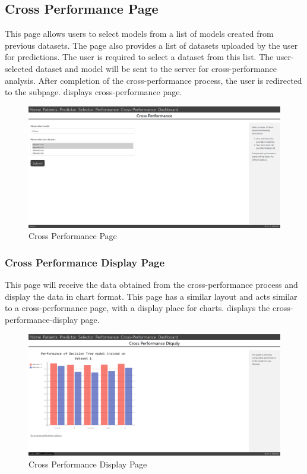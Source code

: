 \subsection{Cross Performance Page} \label{subsec:cross_performance_page}
This page allows users to select models from a list of models created from previous datasets. The page also provides a list of datasets uploaded by the user for predictions. The user is required to select a dataset from this list. The user-selected dataset and model will be sent to the server for cross-performance analysis. After completion of the cross-performance process, the user is redirected to the subpage.  displays cross-performance page.

\begin{figure}[H]
  \centering
  \includegraphics[width=0.7\columnwidth]{media/website/pages/cross_performance_selection.png}
  \caption{Cross Performance Page}
  \label{fig:web_cross_performance_page}
\end{figure}

\subsubsection{Cross Performance Display Page} \label{subsubsec:cross_performance_display Page} This page will receive the data obtained from the cross-performance process and display the data in chart format. This page has a similar layout and acts similar to a cross-performance page, with a display place for charts.  displays the cross-performance-display page.

\begin{figure}[H]
  \centering
  \includegraphics[width=0.7\columnwidth]{media/website/pages/cross_performance_display.png}
  \caption{Cross Performance Display Page}
  \label{fig:web_cross_performance_display_page}
\end{figure}

